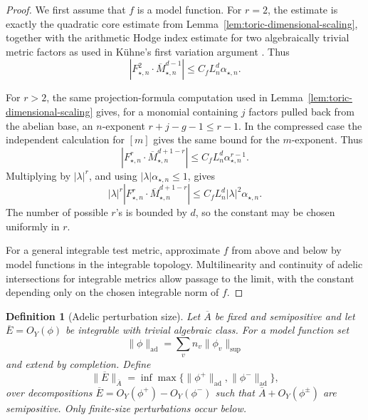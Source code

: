 \documentclass[10pt,a4paper]{amsart}
\theoremstyle{plain}
\newtheorem{definition}[theorem]{Definition}
\theoremstyle{plain}
\numberwithin{equation}{section}
\providecommand{\ol}{\overline}
\begin{document}
\begin{proof}
	We first assume that \(f\) is a model function.  For \(r=2\), the estimate is
	exactly the quadratic core estimate from
	Lemma~\ref{lem:toric-dimensional-scaling}, together with the arithmetic Hodge
	index estimate for two algebraically trivial metric factors as used in
	K\"uhne's first variation argument \cite[Lemma~4.4]{Ku1}.  Thus
	\[
	\left|
	F_{\star,n}^2\cdot \ol M_{\star,n}^{d-1}
	\right|
	\le
	C_f L_n^d\alpha_{\star,n}.
	\]
	
	For \(r>2\), the same projection-formula computation used in
	Lemma~\ref{lem:toric-dimensional-scaling} gives, for a monomial containing
	\(j\) factors pulled back from the abelian base, an \(n\)-exponent
	\(r+j-g-1\le r-1\).  In the compressed case the independent calculation for
	\([m]\) gives the same bound for the \(m\)-exponent.  Thus
	\[
	\left|
	F_{\star,n}^r\cdot \ol M_{\star,n}^{d+1-r}
	\right|
	\le
	C_f L_n^d\alpha_{\star,n}^{r-1}.
	\]
	Multiplying by \(|\lambda|^r\), and using
	\(|\lambda|\alpha_{\star,n}\le1\), gives
	\[
	|\lambda|^r
	\left|
	F_{\star,n}^r\cdot \ol M_{\star,n}^{d+1-r}
	\right|
	\le
	C_f L_n^d|\lambda|^2\alpha_{\star,n}.
	\]
	The number of possible \(r\)'s is bounded by \(d\), so the constant may be
	chosen uniformly in \(r\).
	
	For a general integrable test metric, approximate \(f\) from above and below by
	model functions in the integrable topology.  Multilinearity and continuity of
	adelic intersections for integrable metrics allow passage to the limit, with
	the constant depending only on the chosen integrable norm of \(f\).
\end{proof}

\begin{definition}[Adelic perturbation size]
	Let \(\overline A\) be fixed and semipositive and let
	\(\overline E=O_Y(\phi)\) be integrable with trivial algebraic class.  For a
	model function set
	\[
	\|\phi\|_{\mathrm{ad}}=\sum_v n_v\|\phi_v\|_{\sup}
	\]
	and extend by completion.  Define
	\[
	\|\overline E\|_{\overline A}
	=\inf\max\{\|\phi^+\|_{\mathrm{ad}},\|\phi^-\|_{\mathrm{ad}}\},
	\]
	over decompositions
	\(\overline E=O_Y(\phi^+)-O_Y(\phi^-)\) such that
	\(\overline A+O_Y(\phi^\pm)\) are semipositive.  Only finite-size
	perturbations occur below.
\end{definition}
\end{document}
